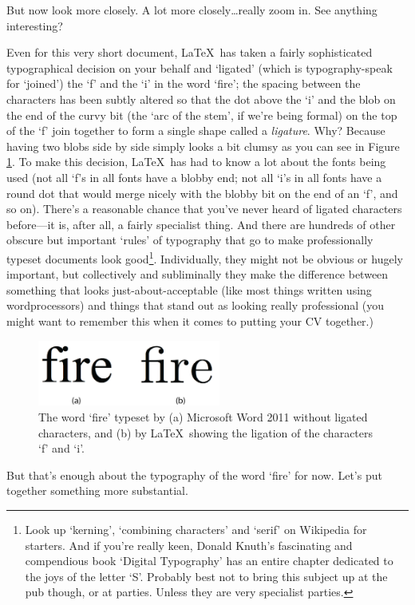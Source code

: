 \begin{refsection}
But now look more closely. A lot more closely\ldots really zoom in. See anything interesting?

Even for this very short document, \LaTeX\ has taken a fairly sophisticated typographical decision on your behalf and `ligated' (which is typo\-graphy-speak for `joined') the `f' and the `i' in the word `fire'; the spacing between the characters has been subtly altered so that the dot above the `i' and the blob on the end of the curvy bit (the `arc of the stem', if we're being formal) on the top of the `f' join together to form a single shape called a \emph{ligature}. Why? Because having two blobs side by side simply looks a bit clumsy as you can see in Figure \ref{figure:twofires}. To make this decision, \LaTeX\ has had to know a lot about the fonts being used (not all `f's in all fonts have a blobby end; not all `i's in all fonts have a round dot that would merge nicely with the blobby bit on the end of an `f', and so on). There's a reasonable chance that you've never heard of ligated characters before---it is, after all, a fairly specialist thing. And there are hundreds of other obscure but important `rules' of typography that go to make professionally typeset documents look good\footnote{Look up `kerning', `combining characters' and `serif' on Wikipedia for starters. And if you're really keen, Donald Knuth's fascinating and compendious book `Digital Typography' \citep{knuth1999} has an entire chapter dedicated to the joys of the letter `S'. Probably best not to bring this subject up at the pub though, or at parties. Unless they are very specialist parties.}. Individually, they might not be obvious or hugely important, but collectively and subliminally they make the difference between something that looks just-about-acceptable (like most things written using wordprocessors) and things that stand out as looking really professional (you might want to remember this when it comes to putting your CV together.)

\begin{figure}[htbp]
\centerline{\includegraphics[width=6cm]{images/fireandfire.png}}
\caption{The word `fire' typeset by (a) Microsoft Word 2011 without ligated characters, and (b) by \LaTeX\ showing the ligation of the characters `f' and `i'.}\label{figure:twofires}
\end{figure}
%
But that's enough about the typography of the word `fire' for now. Let's put together something more substantial. 


\end{refsection}
